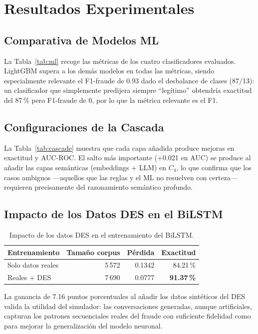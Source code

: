\documentclass{llncs}
\begin{document}
\section{Resultados Experimentales}
\label{sec:results}

\subsection{Comparativa de Modelos ML}

La Tabla~\ref{tab:ml} recoge las métricas de los cuatro clasificadores
evaluados.
LightGBM supera a los demás modelos en todas las métricas,
siendo especialmente relevante el F1-fraude de 0.93 dado el
desbalance de clases (87/13): un clasificador que simplemente
predijera siempre ``legítimo'' obtendría exactitud del 87\,\%
pero F1-fraude de 0, por lo que la métrica relevante es el F1.

\subsection{Configuraciones de la Cascada}

La Tabla~\ref{tab:cascade} muestra que cada capa añadida produce
mejoras en exactitud y AUC-ROC.
El salto más importante (+0.021 en AUC) se produce al añadir las
capas semánticas (embeddings + LLM) en $C_4$, lo que confirma
que los casos ambiguos —aquellos que las reglas y el ML no resuelven
con certeza— requieren precisamente del razonamiento semántico profundo.

\subsection{Impacto de los Datos DES en el BiLSTM}

\begin{table}[t]
\caption{Impacto de los datos DES en el entrenamiento del BiLSTM.}
\label{tab:bilstm}
\centering
\begin{tabular}{lrrr}
\toprule
Entrenamiento & Tamaño corpus & Pérdida & Exactitud \\
\midrule
Solo datos reales  & 5\,572 & 0.1342 & 84.21\,\% \\
Reales + DES       & 7\,690 & 0.0777 & \textbf{91.37\,\%} \\
\bottomrule
\end{tabular}
\end{table}

La ganancia de 7.16 puntos porcentuales al añadir los datos
sintéticos del DES valida la utilidad del simulador:
las conversaciones generadas, aunque artificiales, capturan
los patrones secuenciales reales del fraude con suficiente
fidelidad como para mejorar la generalización del modelo neuronal.
\end{document}
